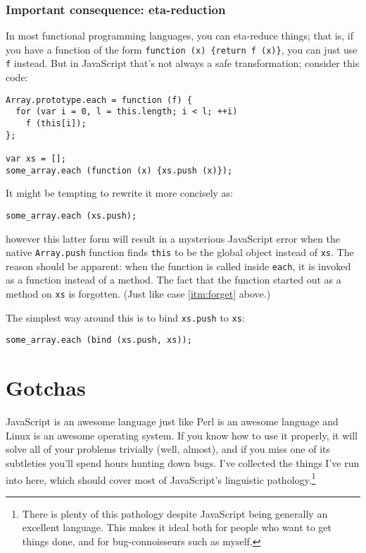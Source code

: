 \documentclass{article}
\begin{document}
\subsubsection {Important consequence: eta-reduction}
      In most functional programming languages, you can eta-reduce things; that is, if you have a function of the form \verb|function (x) {return f (x)}|, you can just use \verb|f| instead.
      But in JavaScript that's not always a safe transformation; consider this code:

\begin{verbatim}
Array.prototype.each = function (f) {
  for (var i = 0, l = this.length; i < l; ++i)
    f (this[i]);
};

var xs = [];
some_array.each (function (x) {xs.push (x)});
\end{verbatim}

      It might be tempting to rewrite it more concisely as:

\begin{verbatim}
some_array.each (xs.push);
\end{verbatim}

      \noindent however this latter form will result in a mysterious JavaScript error when the native \verb|Array.push| function finds \verb|this| to be the global object instead of \verb|xs|.
      The reason should be apparent: when the function is called inside \verb|each|, it is invoked as a function instead of a method. The fact that the function started out as a method on
      \verb|xs| is forgotten. (Just like case \ref{itm:forget} above.)

      The simplest way around this is to bind \verb|xs.push| to \verb|xs|:

\begin{verbatim}
some_array.each (bind (xs.push, xs));
\end{verbatim}

\section {Gotchas}
  JavaScript is an awesome language just like Perl is an awesome language and Linux is an awesome operating system. If you know how to use it properly, it will solve all of your problems
  trivially (well, almost), and if you miss one of its subtleties you'll spend hours hunting down bugs. I've collected the things I've run into here, which should cover most of JavaScript's
  linguistic pathology.\footnote{There is plenty of this pathology despite JavaScript being generally an excellent language. This makes it ideal both for people who want to get things done,
  and for bug-connoisseurs such as myself.}
\end{document}
